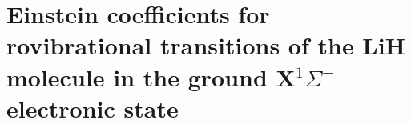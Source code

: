 \chapter{Einstein coefficients for rovibrational transitions of the LiH molecule in the ground X$^1 \Sigma^+$ electronic state\label{apndx2}}



